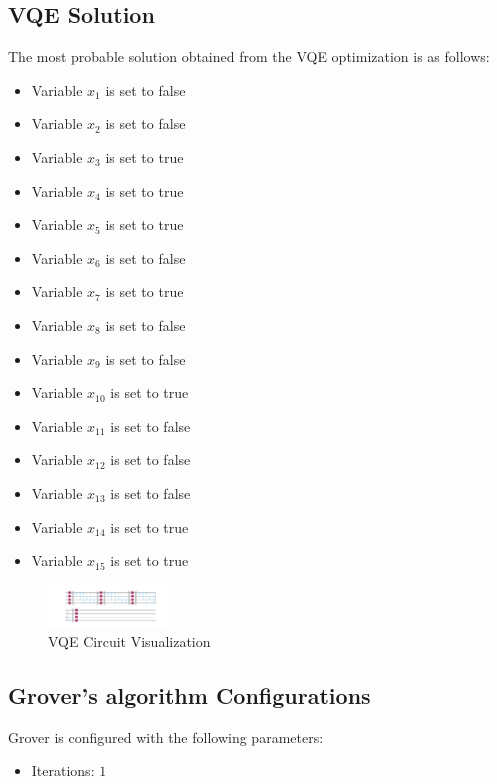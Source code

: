\documentclass{article}%
\begin{document}
%
\subsection{VQE Solution}%
\label{subsec:VQESolution}%
The most probable solution obtained from the VQE optimization is as follows:\newline%
%
\begin{itemize}%
\item Variable \( x_1 \) is set to false%
\item Variable \( x_2 \) is set to false%
\item Variable \( x_3 \) is set to true%
\item Variable \( x_4 \) is set to true%
\item Variable \( x_5 \) is set to true%
\item Variable \( x_6 \) is set to false%
\item Variable \( x_7 \) is set to true%
\item Variable \( x_8 \) is set to false%
\item Variable \( x_9 \) is set to false%
\item Variable \( x_10 \) is set to true%
\item Variable \( x_11 \) is set to false%
\item Variable \( x_12 \) is set to false%
\item Variable \( x_13 \) is set to false%
\item Variable \( x_14 \) is set to true%
\item Variable \( x_15 \) is set to true%
\end{itemize}

%


\begin{figure}[h!]%
\centering%
\includegraphics[width=120px]{quantum_circuit_vqe.png}%
\caption{VQE Circuit Visualization}%
\end{figure}

%
\subsection{Grover's algorithm Configurations}%
\label{subsec:GroversalgorithmConfigurations}%
Grover is configured with the following parameters:\newline%
%
\begin{itemize}%
\item%
Iterations: \(1\)%
\end{itemize}
\end{document}
